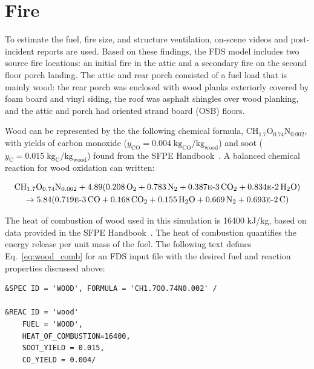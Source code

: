 \documentclass[11pt,oneside]{book}
\renewcommand{\C}{\mbox{C}}
\renewcommand{\H}{\mbox{H}}
\renewcommand{\O}{\mbox{O}}
\newcommand{\N}{\mbox{N}}
\begin{document}
\section{Fire}
\label{fire}

To estimate the fuel, fire size, and structure ventilation, on-scene videos and post-incident reports are used. Based on these findings, the FDS model includes two source fire locations: an initial fire in the attic and a secondary fire on the second floor porch landing. The attic and rear porch consisted of a fuel load that is mainly wood: the rear porch was enclosed with wood planks exteriorly covered by foam board and vinyl siding, the roof was asphalt shingles over wood planking, and the attic and porch had oriented strand board (OSB) floors.  

Wood can be represented by the the following chemical formula, $\C\H_{1.7}\O_{0.74}\N_{0.002}$, with yields of carbon monoxide ($y_{\mathrm{CO}}=0.004 \; {\mathrm{kg_{CO}}/\mathrm{kg_{wood}}}$) and soot ($y_{\mathrm{C}}=0.015 \; {\mathrm{kg_{C}}/\mathrm{kg_{wood}}}$) found from the SFPE Handbook~\cite{SFPE:Tewarson}. A balanced chemical reaction for wood oxidation can written:

\begin{multline}
\C\H_{1.7}\O_{0.74}\N_{0.002} + 4.89(0.208\,\O_{2} + 0.783\,\N_{2} + 0.387\text{\sc{e}-}3\,\C\O_{2} + 0.834\text{\sc{e}-}2\,\H_{2}\O) \\ 
\rightarrow 5.84(0.719\text{\sc{e}-}3\,\C\O + 0.168\,\C\O_{2} + 0.155\,\H_{2}\O + 0.669\,\N_{2} + 0.693\text{\sc{e}-}2\,\C)
\label{eq:wood_comb}
\end{multline}

The heat of combustion of wood used in this simulation is 16400 kJ/kg, based on data provided in the SFPE Handbook~\cite{SFPE:Tewarson}. The heat of combustion quantifies the energy release per unit mass of the fuel. The following text defines Eq.~\ref{eq:wood_comb} for an FDS input file with the desired fuel and reaction properties discussed above:

\begin{lstlisting}
&SPEC ID = 'WOOD', FORMULA = 'CH1.7O0.74N0.002' /

&REAC ID = 'wood' 
    FUEL = 'WOOD', 
    HEAT_OF_COMBUSTION=16400,
    SOOT_YIELD = 0.015,
    CO_YIELD = 0.004/
\end{lstlisting}
\end{document}
